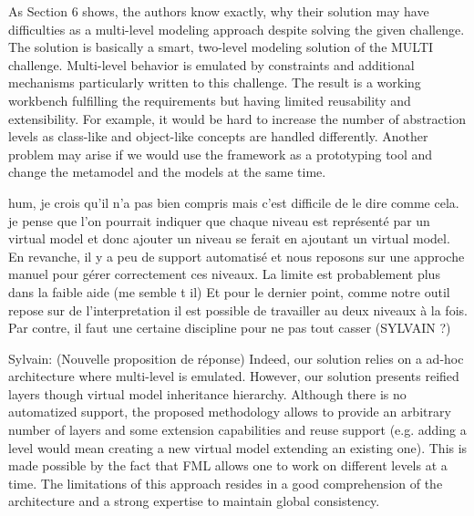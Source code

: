 \documentclass[10pt]{article}
\begin{document}
\begin{response}{As Section 6 shows, the authors know exactly, why their solution may have difficulties as a multi-level modeling approach despite solving the given challenge. The solution is basically a smart, two-level modeling solution of the MULTI challenge. Multi-level behavior is emulated by constraints and additional mechanisms particularly written to this challenge. The result is a working workbench fulfilling the requirements but having limited reusability and extensibility. For example, it would be hard to increase the number of abstraction levels as class-like and object-like concepts are handled differently. Another problem may arise if we would use the framework as a prototyping tool and change the metamodel and the models at the same time.}

{\color{teal}hum, je crois qu'il n'a pas bien compris mais c'est difficile de le dire comme cela. je pense que l'on pourrait indiquer que chaque niveau est représenté par un virtual model et donc ajouter un niveau se ferait en ajoutant un virtual model. En revanche, il y a peu de support automatisé et nous reposons sur une approche manuel pour gérer correctement ces niveaux. La limite est probablement plus dans la faible aide (me semble t il) Et pour le dernier point, comme notre outil repose sur de l'interpretation il est possible de travailler au deux niveaux à la fois. Par contre, il faut une certaine discipline pour ne pas tout casser (SYLVAIN ?)}

{\color{red}Sylvain: (Nouvelle proposition de réponse) Indeed, our solution relies on a ad-hoc architecture where multi-level is emulated. However, our solution presents reified layers though virtual model inheritance hierarchy. Although there is no automatized support, the proposed methodology allows to provide an arbitrary number of layers and some extension capabilities and reuse support (e.g. adding a level would mean creating a new virtual model extending an existing one). This is made possible by the fact that FML allows one to work on different levels at a time. The limitations of this approach resides in a good comprehension of the architecture and a strong expertise to maintain global consistency.}
\end{response}
\end{document}
